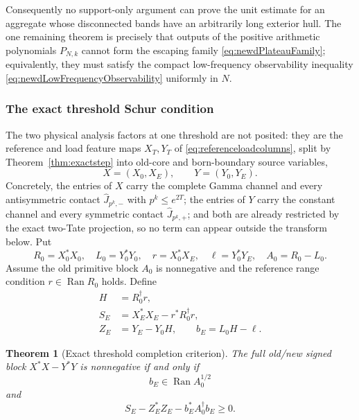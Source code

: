 \documentclass[11pt]{amsart}
\newtheorem{theorem}{Theorem}[section]
\theoremstyle{definition}
\theoremstyle{remark}
\begin{document}
Consequently no support-only argument can prove the unit estimate for an
aggregate whose disconnected bands have an arbitrarily long exterior
hull.  The one remaining theorem is precisely that
outputs of the positive arithmetic polynomials
$P_{N,k}$ cannot form the escaping family
\eqref{eq:newdPlateauFamily}; equivalently, they must satisfy the compact
low-frequency observability inequality
\eqref{eq:newdLowFrequencyObservability} uniformly in $N$.

\subsubsection{The exact threshold Schur condition}

The two physical analysis factors at one threshold are not posited: they are
the reference and load feature maps \(X_T,Y_T\) of
\eqref{eq:referenceloadcolumns}, split by
Theorem~\ref{thm:exactstep} into old-core and born-boundary source variables,
\[
 X=(X_0,X_E),\qquad Y=(Y_0,Y_E).
\]
Concretely, the entries of \(X\) carry the complete Gamma channel and every
antisymmetric contact \(\widehat J_{p^k,-}\) with \(p^k\le e^{2T}\); the
entries of \(Y\) carry the constant channel and every symmetric contact
\(\widehat J_{p^k,+}\); and both are already restricted by the exact two-Tate
projection, so no term can appear outside the transform below.  Put
\begin{equation}\label{eq:newdPhysicalBlocks}
 R_0=X_0^*X_0,
 \quad L_0=Y_0^*Y_0,
 \quad r=X_0^*X_E,
 \quad \ell=Y_0^*Y_E,
 \quad A_0=R_0-L_0.
\end{equation}
Assume the old primitive block $A_0$ is nonnegative and the reference range
condition $r\in\operatorname{Ran}R_0$ holds.  Define
\begin{align}
 H&=R_0^\dagger r,
 \label{eq:newdReferenceLift}\\
 S_E&=X_E^*X_E-r^*R_0^\dagger r,
 \label{eq:newdReferenceSchur}\\
 Z_E&=Y_E-Y_0H,
 \qquad
 b_E=L_0H-\ell.
 \label{eq:newdOppositeResidual}
\end{align}

\begin{theorem}[Exact threshold completion criterion]
\label{thm:newdThresholdCriterion}
The full old/new signed block $X^*X-Y^*Y$ is nonnegative if and only if
\begin{equation}\label{eq:newdRangeCondition}
 b_E\in\operatorname{Ran}A_0^{1/2}
\end{equation}
and
\begin{equation}\label{eq:newdSchurTarget}
 S_E-Z_E^*Z_E-b_E^*A_0^\dagger b_E\geq0.
\end{equation}
\end{theorem}
\end{document}
